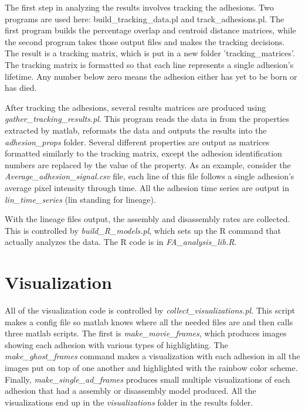 \documentclass[letterpaper]{article}
\begin{document}
	The first step in analyzing the results involves tracking the adhesions. Two
	programs are used here: build\_tracking\_data.pl and track\_adhesions.pl. The
	first program builds the percentage overlap and centroid distance matrices,
	while the second program takes those output files and makes the tracking
	decisions. The result is a tracking matrix, which is put in a new folder
	'tracking\_matrices'.  The tracking matrix is formatted so that each line
	represents a single adhesion's lifetime. Any number below zero means the
	adhesion either has yet to be born or has died.

	After tracking the adhesions, several results matrices are produced using
	\emph{gather\_tracking\_results.pl}. This program reads the data in from the
	properties extracted by matlab, reformats the data and outputs the results
	into the \emph{adhesion\_props} folder. Several different properties are
	output as matrices formatted similarly to the tracking matrix, except the
	adhesion identification numbers are replaced by the value of the property.
	As an example, consider the \emph{Average\_adhesion\_signal.csv} file, each
	line of this file follows a single adhesion's average pixel intensity
	through time. All the adhesion time series are output in
	\emph{lin\_time\_series} (lin standing for lineage).

	With the lineage files output, the assembly and disassembly rates are
	collected. This is controlled by \emph{build\_R\_models.pl}, which sets up the
	R command that actually analyzes the data. The R code is in
	\emph{FA\_analysis\_lib.R}.

\section{Visualization}

	All of the visualization code is controlled by
	\emph{collect\_visualizations.pl}. This script makes a config file so matlab
	knows where all the needed files are and then calls three matlab scripts.
	The first is \emph{make\_movie\_frames}, which produces images showing each
	adhesion with various types of highlighting. The \emph{make\_ghost\_frames}
	command makes a visualization with each adhesion in all the images put on
	top of one another and highlighted with the rainbow color scheme. Finally,
	\emph{make\_single\_ad\_frames} produces small multiple visualizations of each
	adhesion that had a assembly or disassembly model produced. All the
	visualizations end up in the \emph{visualizations} folder in the results
	folder.

{}

\end{document}
